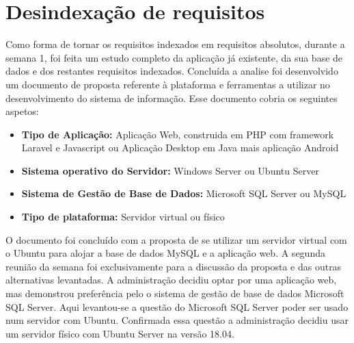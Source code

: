 \section{Desindexação de requisitos}
Como forma de tornar os requisitos indexados em requisitos absolutos, durante a semana 1, foi feita um estudo completo da aplicação já existente, da sua base de dados e dos restantes requisitos indexados.
Concluída a analise foi desenvolvido um documento de proposta referente à plataforma e ferramentas a utilizar no desenvolvimento do sistema de informação. Esse documento cobria os seguintes aspetos:
\begin{itemize}
    \item \textbf{Tipo de Aplicação:} Aplicação Web, construida em PHP com framework Laravel e Javascript ou Aplicação Desktop em Java mais aplicação Android
    \item \textbf{Sistema operativo do Servidor:} Windows Server ou Ubuntu Server
    \item \textbf{Sistema de Gestão de Base de Dados:} Microsoft SQL Server ou MySQL
    \item \textbf{Tipo de plataforma:} Servidor virtual ou físico
\end{itemize}
O documento foi concluído com a proposta de se utilizar um servidor virtual com o Ubuntu para alojar a base de dados MySQL e a aplicação web.
A segunda reunião da semana foi exclusivamente para a discussão da proposta e das outras alternativas levantadas. A administração decidiu optar por uma aplicação web, mas demonstrou preferência pelo o sistema de gestão de base de dados Microsoft SQL Server. Aqui levantou-se a questão do Microsoft SQL Server poder ser usado num servidor com Ubuntu. Confirmada essa questão a administração decidiu usar um servidor físico com Ubuntu Server na versão 18.04.

